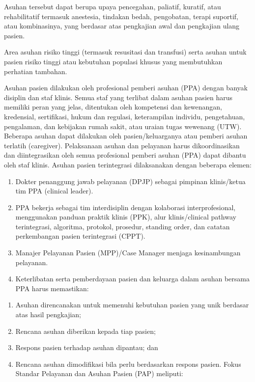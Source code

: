 \documentclass[
]{book}
\providecommand{\tightlist}{%
  \setlength{\itemsep}{0pt}\setlength{\parskip}{0pt}}
\begin{document}
Asuhan tersebut dapat berupa upaya pencegahan, paliatif, kuratif, atau rehabilitatif termasuk anestesia, tindakan bedah, pengobatan, terapi suportif, atau kombinasinya, yang berdasar atas pengkajian awal dan pengkajian ulang pasien.

Area asuhan risiko tinggi (termasuk resusitasi dan transfusi) serta asuhan untuk pasien risiko tinggi atau kebutuhan populasi khusus yang membutuhkan perhatian tambahan.

Asuhan pasien dilakukan oleh profesional pemberi asuhan (PPA) dengan banyak disiplin dan staf klinis. Semua staf yang terlibat dalam asuhan pasien harus memiliki peran yang jelas, ditentukan oleh kompetensi dan kewenangan, kredensial, sertifikasi, hukum dan regulasi, keterampilan individu, pengetahuan, pengalaman, dan kebijakan rumah sakit, atau uraian tugas wewenang (UTW). Beberapa asuhan dapat dilakukan oleh pasien/keluarganya atau pemberi asuhan terlatih (caregiver). Pelaksanaan asuhan dan pelayanan harus dikoordinasikan dan diintegrasikan oleh semua profesional pemberi asuhan (PPA) dapat dibantu oleh staf klinis. Asuhan pasien terintegrasi dilaksanakan dengan beberapa elemen:

\begin{enumerate}
\def\labelenumi{\alph{enumi}.}
\tightlist
\item
  Dokter penanggung jawab pelayanan (DPJP) sebagai pimpinan klinis/ketua tim PPA (clinical leader).
\item
  PPA bekerja sebagai tim interdisiplin dengan kolaborasi interprofesional, menggunakan panduan praktik klinis (PPK), alur klinis/clinical pathway terintegrasi, algoritma, protokol, prosedur, standing order, dan catatan perkembangan pasien terintegrasi (CPPT).
\item
  Manajer Pelayanan Pasien (MPP)/Case Manager menjaga kesinambungan pelayanan.
\item
  Keterlibatan serta pemberdayaan pasien dan keluarga dalam asuhan bersama PPA harus memastikan:
\end{enumerate}

\begin{enumerate}
\def\labelenumi{\arabic{enumi}.}
\tightlist
\item
  Asuhan direncanakan untuk memenuhi kebutuhan pasien yang unik berdasar atas hasil pengkajian;
\item
  Rencana asuhan diberikan kepada tiap pasien;
\item
  Respons pasien terhadap asuhan dipantau; dan
\item
  Rencana asuhan dimodifikasi bila perlu berdasarkan respons pasien.
  Fokus Standar Pelayanan dan Asuhan Pasien (PAP) meliputi:
\end{enumerate}
\end{document}
